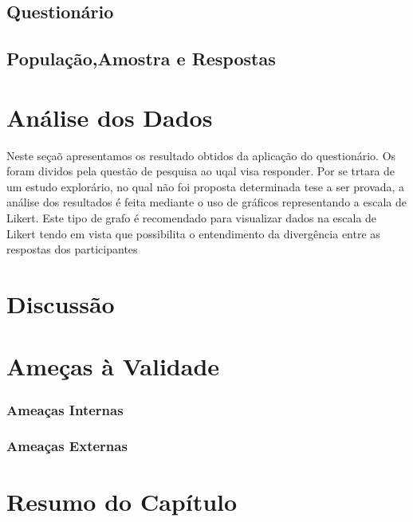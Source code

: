 \subsection{Questionário}
\label{subsec:questionario}




\subsection{População,Amostra e Respostas}
\label{subsec:populacao_amostra_respostas}



\section{Análise dos Dados}
\label{sec:analise_dados}

Neste seçaõ apresentamos os resultado obtidos da aplicação do questionário. Os foram dividos pela questão de pesquisa ao uqal visa responder. Por se trtara de um estudo explorário, no qual não foi proposta determinada tese a ser provada, a análise dos resultados é feita mediante o uso de gráficos representando a escala de Likert. Este tipo de grafo é recomendado para visualizar dados na escala de Likert tendo em vista que possibilita o entendimento da divergência entre as respostas dos participantes \cite{robbins2011plotting}

\section{Discussão}

\section{Ameças à Validade}


\subsubsection{Ameaças Internas}
\label{ssub:Ameaças Internas}

\subsubsection{Ameaças Externas}
\label{ssub:Ameaças Externas}


\section{Resumo do Capítulo}
